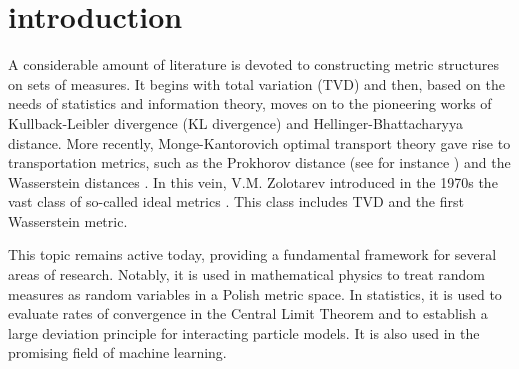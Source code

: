 \documentclass[11pt,reqno]{amsart}
\theoremstyle{definition}
\numberwithin{equation}{section}
\begin{document}
    
\section{introduction}

A considerable amount of literature is devoted to constructing metric structures on sets of measures. 
 It begins with total variation (TVD) and then, based on the needs of statistics and information theory, moves on to the pioneering works of Kullback-Leibler divergence (KL divergence) and Hellinger-Bhattacharyya distance.
More recently, Monge-Kantorovich optimal transport theory gave rise to transportation metrics, such as the Prokhorov distance (see for instance \cite{Dudley}) and the Wasserstein distances \cite{villani2003,santambrogio2015}. In this vein, V.M. Zolotarev introduced in the 1970s the vast class of   so-called ideal metrics \cite{zolotarev1978}.  This class includes TVD and the first Wasserstein metric.

This topic remains active today, providing a fundamental framework for several areas of research. Notably, it is used in mathematical physics to treat random measures as random variables in a Polish metric space. In statistics, it is used to evaluate rates of convergence in the Central Limit Theorem and to establish a large deviation principle for interacting particle models. It is also used in the promising field of machine learning.

\end{document}
